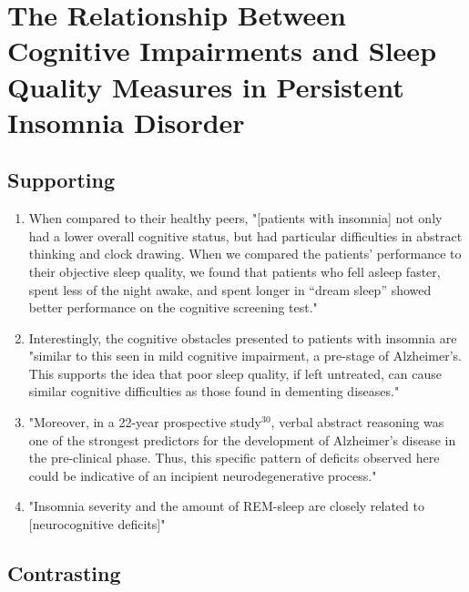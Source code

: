 \section{The Relationship Between Cognitive Impairments and Sleep Quality Measures in Persistent Insomnia Disorder \parencite{3}}

\begin{centering}\subsection{Supporting}\end{centering}

\begin{enumerate}

	\item When compared to their healthy peers, "[patients with insomnia] not only had a lower overall cognitive status, but had particular difficulties in abstract thinking and clock drawing. When we compared the patients’ performance to their objective sleep quality, we found that patients who fell asleep faster, spent less of the night awake, and spent longer in “dream sleep” showed better performance on the cognitive screening test."

	\item Interestingly, the cognitive obstacles presented to patients with insomnia are "similar to this seen in mild cognitive impairment, a pre-stage of Alzheimer’s. This supports the idea that poor sleep quality, if left untreated, can cause similar cognitive difficulties as those found in dementing diseases."

	\item "Moreover, in a 22-year prospective study$^{30}$, verbal abstract reasoning was one of the strongest predictors for the development of Alzheimer’s disease in the pre-clinical phase. Thus, this specific pattern of deficits observed here could be indicative of an incipient neurodegenerative process." 

	\item "Insomnia severity and the amount of REM-sleep are closely related to [neurocognitive deficits]" \parencite{3}

\end{enumerate}

\begin{centering}\subsection{Contrasting}\end{centering}

